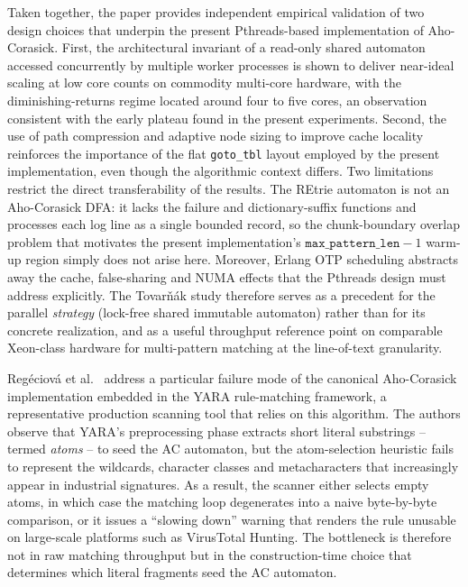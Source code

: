 Taken together, the paper provides independent empirical validation of two design choices that underpin the present Pthreads-based implementation of Aho-Corasick. First, the architectural invariant of a read-only shared automaton accessed concurrently by multiple worker processes is shown to deliver near-ideal scaling at low core counts on commodity multi-core hardware, with the diminishing-returns regime located around four to five cores, an observation consistent with the early plateau found in the present experiments. Second, the use of path compression and adaptive node sizing to improve cache locality reinforces the importance of the flat \texttt{goto\_tbl} layout employed by the present implementation, even though the algorithmic context differs. Two limitations restrict the direct transferability of the results. The REtrie automaton is not an Aho-Corasick DFA: it lacks the failure and dictionary-suffix functions and processes each log line as a single bounded record, so the chunk-boundary overlap problem that motivates the present implementation's $\texttt{max\_pattern\_len}-1$ warm-up region simply does not arise here. Moreover, Erlang OTP scheduling abstracts away the cache, false-sharing and NUMA effects that the Pthreads design must address explicitly. The Tovar{\v{n}}ák study therefore serves as a precedent for the parallel \emph{strategy} (lock-free shared immutable automaton) rather than for its concrete realization, and as a useful throughput reference point on comparable Xeon-class hardware for multi-pattern matching at the line-of-text granularity.


Reg{\'e}ciov{\'a} et al.\ \cite{Regeciova2021MYARA} address a particular failure mode of the canonical Aho-Corasick implementation embedded in the YARA rule-matching framework, a representative production scanning tool that relies on this algorithm. The authors observe that YARA's preprocessing phase extracts short literal substrings -- termed \emph{atoms} -- to seed the AC automaton, but the atom-selection heuristic fails to represent the wildcards, character classes and metacharacters that increasingly appear in industrial signatures. As a result, the scanner either selects empty atoms, in which case the matching loop degenerates into a naive byte-by-byte comparison, or it issues a ``slowing down'' warning that renders the rule unusable on large-scale platforms such as VirusTotal Hunting. The bottleneck is therefore not in raw matching throughput but in the construction-time choice that determines which literal fragments seed the AC automaton.

